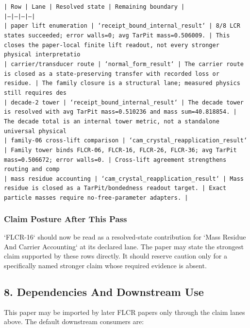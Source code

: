 \documentclass[11pt]{article}
\begin{document}
\noindent\texttt{| Row | Lane | Resolved state | Remaining boundary |}\\
\noindent\texttt{|---|---|---|---|}\\
\noindent\texttt{| paper lift enumeration | `receipt\_bound\_internal\_result` | 8/8 LCR states succeeded; error walls=0; avg TarPit mass=0.506009. | This closes the paper-local finite lift readout, not every stronger physical interpretatio}\\
\noindent\texttt{| carrier/transducer route | `normal\_form\_result` | The carrier route is closed as a state-preserving transfer with recorded loss or residue. | The family closure is a structural lane; measured physics still requires des}\\
\noindent\texttt{| decade-2 tower | `receipt\_bound\_internal\_result` | The decade tower is resolved with avg TarPit mass=0.510236 and mass sum=40.818854. | The decade total is an internal tower metric, not a standalone universal physical }\\
\noindent\texttt{| family-06 cross-lift comparison | `cam\_crystal\_reapplication\_result` | Family tower binds FLCR-06, FLCR-16, FLCR-26, FLCR-36; avg TarPit mass=0.506672; error walls=0. | Cross-lift agreement strengthens routing and comp}\\
\noindent\texttt{| mass residue accounting | `cam\_crystal\_reapplication\_result` | Mass residue is closed as a TarPit/bondedness readout target. | Exact particle masses require no-free-parameter adapters. |}\\

\subsubsection*{Claim Posture After This Pass}

`FLCR-16` should now be read as a resolved-state contribution for `Mass Residue And Carrier Accounting` at its declared lane. The paper may state the strongest claim supported by these rows directly. It should reserve caution only for a specifically named stronger claim whose required evidence is absent.

\subsection*{8. Dependencies And Downstream Use}

This paper may be imported by later FLCR papers only through the claim lanes
above. The default downstream consumers are:
\end{document}
